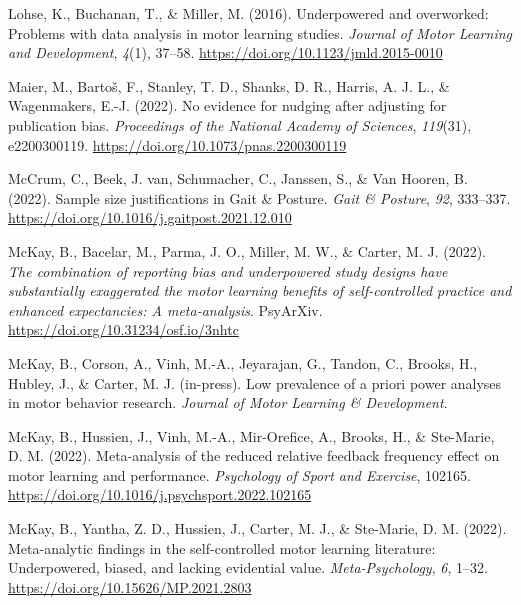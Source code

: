 \documentclass[
  man, donotrepeattitle,mask,floatsintext]{apa7}
\newlength{\cslhangindent}
\newlength{\cslentryspacingunit} %
\newenvironment{CSLReferences}[2] %
 {%
  \setlength{\parindent}{0pt}
  \ifodd #1
  \let\oldpar\par
  \def\par{\hangindent=\cslhangindent\oldpar}
  \fi
  \setlength{\parskip}{#2\cslentryspacingunit}
 }%
 {}
\begin{document}
\begin{CSLReferences}{1}{0}
\leavevmode{}%
Lohse, K., Buchanan, T., \& Miller, M. (2016). Underpowered and overworked: Problems with data analysis in motor learning studies. \emph{Journal of Motor Learning and Development}, \emph{4}(1), 37--58. \url{https://doi.org/10.1123/jmld.2015-0010}

\leavevmode{}%
Maier, M., Bartoš, F., Stanley, T. D., Shanks, D. R., Harris, A. J. L., \& Wagenmakers, E.-J. (2022). No evidence for nudging after adjusting for publication bias. \emph{Proceedings of the National Academy of Sciences}, \emph{119}(31), e2200300119. \url{https://doi.org/10.1073/pnas.2200300119}

\leavevmode{}%
McCrum, C., Beek, J. van, Schumacher, C., Janssen, S., \& Van Hooren, B. (2022). Sample size justifications in {Gait \& Posture}. \emph{Gait \& Posture}, \emph{92}, 333--337. \url{https://doi.org/10.1016/j.gaitpost.2021.12.010}

\leavevmode{}%
McKay, B., Bacelar, M., Parma, J. O., Miller, M. W., \& Carter, M. J. (2022). \emph{The combination of reporting bias and underpowered study designs have substantially exaggerated the motor learning benefits of self-controlled practice and enhanced expectancies: A meta-analysis}. PsyArXiv. \url{https://doi.org/10.31234/osf.io/3nhtc}

\leavevmode{}%
McKay, B., Corson, A., Vinh, M.-A., Jeyarajan, G., Tandon, C., Brooks, H., Hubley, J., \& Carter, M. J. (in-press). Low prevalence of a priori power analyses in motor behavior research. \emph{Journal of Motor Learning \& Development}.

\leavevmode{}%
McKay, B., Hussien, J., Vinh, M.-A., Mir-Orefice, A., Brooks, H., \& Ste-Marie, D. M. (2022). Meta-analysis of the reduced relative feedback frequency effect on motor learning and performance. \emph{Psychology of Sport and Exercise}, 102165. \url{https://doi.org/10.1016/j.psychsport.2022.102165}

\leavevmode{}%
McKay, B., Yantha, Z. D., Hussien, J., Carter, M. J., \& Ste-Marie, D. M. (2022). Meta-analytic findings in the self-controlled motor learning literature: Underpowered, biased, and lacking evidential value. \emph{Meta-Psychology}, \emph{6}, 1--32. \url{https://doi.org/10.15626/MP.2021.2803}


\end{CSLReferences}
\end{document}
